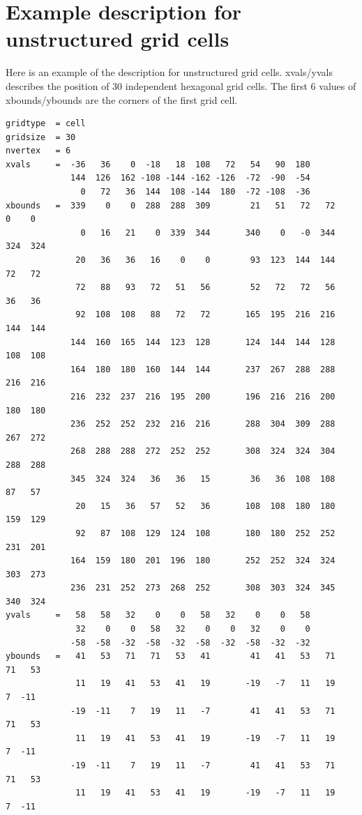 \section{Example description for unstructured grid cells}
Here is an example of the {\CDO} description for unstructured grid cells.
xvals/yvals describes the position of 30 independent hexagonal grid cells.
The first 6 values of xbounds/ybounds are the corners of the first grid cell.
\begin{lstlisting}[frame=single, backgroundcolor=\color{pyellow}, basicstyle=\footnotesize]
gridtype  = cell
gridsize  = 30
nvertex   = 6
xvals     =  -36   36    0  -18   18  108   72   54   90  180 
             144  126  162 -108 -144 -162 -126  -72  -90  -54
               0   72   36  144  108 -144  180  -72 -108  -36 
xbounds   =  339    0    0  288  288  309        21   51   72   72    0    0
               0   16   21    0  339  344       340    0   -0  344  324  324
              20   36   36   16    0    0        93  123  144  144   72   72
              72   88   93   72   51   56        52   72   72   56   36   36
              92  108  108   88   72   72       165  195  216  216  144  144
             144  160  165  144  123  128       124  144  144  128  108  108
             164  180  180  160  144  144       237  267  288  288  216  216
             216  232  237  216  195  200       196  216  216  200  180  180
             236  252  252  232  216  216       288  304  309  288  267  272
             268  288  288  272  252  252       308  324  324  304  288  288
             345  324  324   36   36   15        36   36  108  108   87   57
              20   15   36   57   52   36       108  108  180  180  159  129
              92   87  108  129  124  108       180  180  252  252  231  201
             164  159  180  201  196  180       252  252  324  324  303  273
             236  231  252  273  268  252       308  303  324  345  340  324
yvals     =   58   58   32    0    0   58   32    0    0   58
              32    0    0   58   32    0    0   32    0    0
             -58  -58  -32  -58  -32  -58  -32  -58  -32  -32 
ybounds   =   41   53   71   71   53   41        41   41   53   71   71   53
              11   19   41   53   41   19       -19   -7   11   19    7  -11
             -19  -11    7   19   11   -7        41   41   53   71   71   53
              11   19   41   53   41   19       -19   -7   11   19    7  -11
             -19  -11    7   19   11   -7        41   41   53   71   71   53
              11   19   41   53   41   19       -19   -7   11   19    7  -11

\end{lstlisting}
